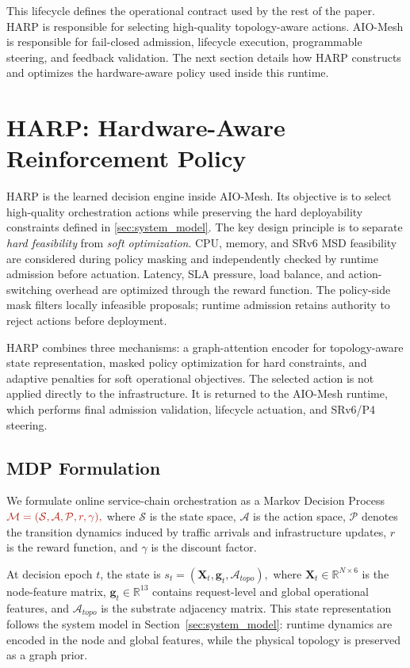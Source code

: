 \documentclass[final,5p]{elsarticle}
\newcommand{\rev}[1]{\textcolor{BrickRed}{#1}}
\begin{document}
This lifecycle defines the operational contract used by the rest of the paper. HARP is responsible for selecting high-quality topology-aware actions. AIO-Mesh is responsible for fail-closed admission, lifecycle execution, programmable steering, and feedback validation. The next section details how HARP constructs and optimizes the hardware-aware policy used inside this runtime.

\section{HARP: Hardware-Aware Reinforcement Policy}
\label{sec:harp}

HARP is the learned decision engine inside AIO-Mesh. Its objective is to select high-quality orchestration actions while preserving the hard deployability constraints defined in \autoref{sec:system_model}. The key design principle is to separate \emph{hard feasibility} from \emph{soft optimization}. CPU, memory, and SRv6 MSD feasibility are \rev{considered during policy masking and independently checked by runtime admission} before actuation. Latency, SLA pressure, load balance, and \rev{action-switching overhead} are optimized through the reward function. \rev{The policy-side mask filters locally infeasible proposals; runtime admission retains authority to reject actions before deployment.}

HARP combines three mechanisms: a graph-attention encoder for topology-aware state representation, masked policy optimization for hard constraints, and adaptive penalties for soft operational objectives. The selected action is not applied directly to the infrastructure. It is returned to the AIO-Mesh runtime, which performs final admission validation, lifecycle actuation, and SRv6/P4 steering.

\subsection{MDP Formulation}
\label{subsec:harp_mdp}

We formulate online service-chain orchestration as a Markov Decision Process
$ \rev{\mathcal{M}=(\mathcal{S},\mathcal{A},\mathcal{P},r,\gamma),}$
where \(\mathcal{S}\) is the state space, \(\mathcal{A}\) is the action space, \(\mathcal{P}\) denotes the transition dynamics induced by traffic arrivals and infrastructure updates, \rev{\(r\)} is the reward function, and \(\gamma\) is the discount factor.

At decision epoch \(t\), the state is $ s_t=(\mathbf{X}_t,\mathbf{g}_t,\mathcal{A}_{topo}),$
where \(\mathbf{X}_t\in\mathbb{R}^{N\times 6}\) is the node-feature matrix, \(\mathbf{g}_t\in\mathbb{R}^{13}\) contains request-level and global operational features, and \(\mathcal{A}_{topo}\) is the substrate adjacency matrix. This state representation follows the system model in Section~\ref{sec:system_model}: runtime dynamics are encoded in the node and global features, while the physical topology is preserved as a graph prior.
\end{document}
